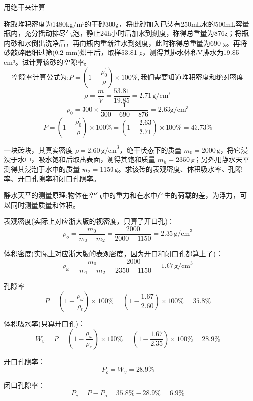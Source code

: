 \documentclass[12pt, a4paper, oneside, UTF8]{ctexbook}
\begin{document}
\begin{remark}
    用绝干来计算
\end{remark}

\begin{example}
称取堆积密度为1480kg/m³的干砂300g，将此砂加入已装有250mL水的500mL容量瓶内，充分摇动排尽气泡，静止24h小时后加水到刻度，称得总重量为876g；将瓶内砂和水倒出洗净后，再向瓶内重新注水到刻度，此时称得总重量为690 g。再将砂敲碎磨细过筛(0.2 mm)烘干后，取样53.81 g，测得其排水体积V排水为19.85 cm³。试计算该砂的空隙率。
$$
\text{空隙率计算公式为:}P=\left(1 - \frac{\rho_0^{\prime}}{\rho}\right) \times 100\%,\text{我们需要知道堆积密度和绝对密度}
$$
$$
\rho = \frac{m}{V} = \frac{53.81}{19.85} = 2.71\,\mathrm{g}/\mathrm{cm}^3
$$
$$
\rho_0 = 300 \times \frac{1}{300 + 690 - 876} = 2.63\text{g}/\text{cm}^3
$$
$$
P = \left(1 - \frac{\rho_0^{\prime}}{\rho}\right) \times 100\% = \left(1 - \frac{2.63}{2.71}\right) \times 100\% = 43.73\%
$$
\end{example}

\begin{example}
一块砖块，其真实密度 $\rho = 2.60 \, \text{g/cm}^3$，绝干状态下的质量 $m_0 = 2000 \, \text{g}$，将它浸没于水中，吸水饱和后取出表面，测得其饱和质量 $m_h = 2350 \, \text{g}$；另外用静水天平测得其浸泡于水中的质量 $m_2 = 1150 \, \text{g}$。求该砖的表观密度、体积吸水率、孔隙率、开口孔隙率和闭口孔隙率。

\begin{remark}
    静水天平的测量原理:物体在空气中的重力和在水中产生的荷载的差，为浮力，可以同时测量质量和体积。
\end{remark}

表观密度(实际上对应浙大版的视密度，只算了开口孔)： 
$$
\rho_o = \frac{m_0}{m_0 - m_2} = \frac{2000}{2000 - 1150} = 2.35 \, \text{g/cm}^3
$$

体积密度(实际上对应浙大版的表观密度，因为开口和闭口孔都算上了)： 
$$
\rho_\omega = \frac{m_0}{m_1 - m_2} = \frac{2000}{2350 - 1150} = 1.67 \, \text{g/cm}^3
$$

孔隙率：
$$
P = \left( 1 - \frac{\rho_\omega}{\rho_t} \right) \times 100\% = \left( 1 - \frac{1.67}{2.60} \right) \times 100\% = 35.8\%
$$

体积吸水率(只算开口孔)：
$$
W_v = P = \left( 1 - \frac{\rho_\omega}{\rho_e} \right) \times 100\% = \left( 1 - \frac{1.67}{2.35} \right) \times 100\% = 28.9\%
$$

开口孔隙率：
$$
P_o = W_v = 28.9\%
$$

闭口孔隙率：
$$
P_c = P - P_o = 35.8\% - 28.9\% = 6.9\%
$$
\end{example}
\end{document}

